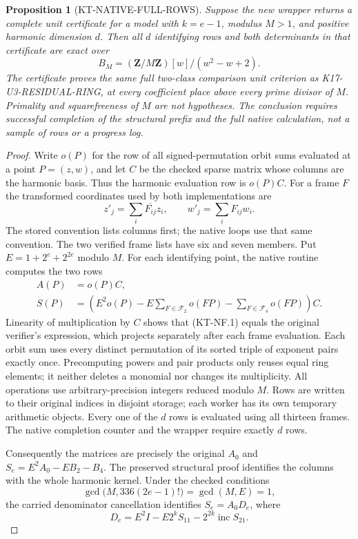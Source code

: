 \documentclass[11pt,a4paper]{article}
\newtheorem{proposition}[theorem]{Proposition}
\theoremstyle{definition}
\begin{document}
\begin{proposition}[KT-NATIVE-FULL-ROWS]
Suppose the new wrapper returns a complete unit certificate for a
model with $k=e-1$, modulus $M>1$, and positive harmonic dimension
$d$.  Then all $d$ identifying rows and both determinants in that
certificate are exact over
\[
 B_M=(\mathbf Z/M\mathbf Z)[w]/(w^2-w+2).
\]
The certificate proves the same full two-class comparison unit
criterion as K17-U3-RESIDUAL-RING, at every coefficient place above
every prime divisor of $M$.  Primality and squarefreeness of $M$
are not hypotheses.  The conclusion requires successful completion
of the structural prefix and the full native calculation, not a
sample of rows or a progress log.
\end{proposition}
\begin{proof}
Write $o(P)$ for the row of all signed-permutation orbit sums
evaluated at a point $P=(z,w)$, and let $C$ be the checked sparse
matrix whose columns are the harmonic basis.  Thus the harmonic
evaluation row is $o(P)C$.  For a frame $F$ the transformed coordinates
used by both implementations are
\[
 z'_j=\sum_i\overline{F_{ij}}z_i,
 \qquad w'_j=\sum_iF_{ij}w_i.
\]
The stored convention lists columns first; the native loops use
that same convention.  The two verified frame lists have six and
seven members.  Put $E=1+2^e+2^{2e}$ modulo $M$.  For each identifying
point, the native routine computes the two rows
\[
 \begin{split}
 A(P)&=o(P)C,\\
 S(P)&=\left(E^2o(P)-E\sum_{F\in\mathcal F_2}o(FP)
                         -\sum_{F\in\mathcal F_4}o(FP)\right)C.
 \end{split}                                                    \tag{KT-NF.1}
\]
Linearity of multiplication by $C$ shows that (KT-NF.1) equals
the original verifier's expression, which projects separately
after each frame evaluation.  Each orbit sum uses every distinct
permutation of its sorted triple of exponent pairs exactly once.
Precomputing powers and pair products only reuses equal ring
elements; it neither deletes a monomial nor changes its multiplicity.
All operations use arbitrary-precision integers reduced modulo $M$.
Rows are written to their original indices in disjoint storage;
each worker has its own temporary arithmetic objects.  Every one
of the $d$ rows is evaluated using all thirteen frames.  The native
completion counter and the wrapper require exactly $d$ rows.

Consequently the matrices are precisely the original $A_0$ and
$S_e=E^2A_0-EB_2-B_4$.  The preserved structural proof identifies
the columns with the whole harmonic kernel.  Under the checked
conditions
\[
 \gcd\bigl(M,336(2e-1)!\bigr)=\gcd(M,E)=1,
\]
the carried denominator cancellation identifies $S_e=A_0D_e$,
where
\[
 D_e=E^2I-E2^kS_{11}-2^{2k}\operatorname{inc}S_{21}.
\]


\end{proof}
\end{document}
